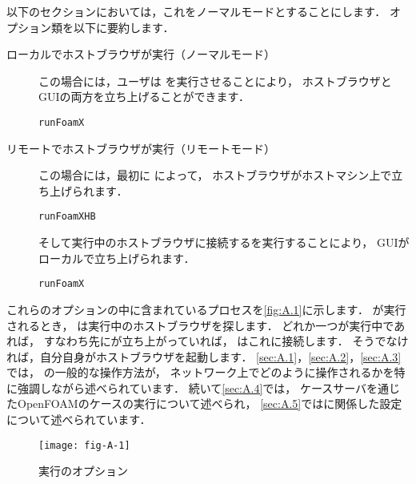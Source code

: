 以下のセクションにおいては，これをノーマルモードとすることにします．
オプション類を以下に要約します．
\begin{description}
 \item[ローカルでホストブラウザが実行（ノーマルモード）]
            この場合には，ユーザは
%
%
            を実行させることにより，
            ホストブラウザとGUIの両方を立ち上げることができます．
\begin{OFterminal}
\begin{verbatim}
runFoamX
\end{verbatim}
\end{OFterminal}
 \item[リモートでホストブラウザが実行（リモートモード）]
            この場合には，最初に
%
%
            によって，
            ホストブラウザがホストマシン上で立ち上げられます．
\begin{OFterminal}
\begin{verbatim}
runFoamXHB
\end{verbatim}
\end{OFterminal}
            そして実行中のホストブラウザに接続するを実行することにより，
            GUIがローカルで立ち上げられます．
\begin{OFterminal}
\begin{verbatim}
runFoamX
\end{verbatim}
\end{OFterminal}
\end{description}
これらのオプションの中に含まれているプロセスを\autoref{fig:A.1}に示します．
が実行されるとき，
は実行中のホストブラウザを探します．
どれか一つが実行中であれば，
すなわち先にが立ち上がっていれば，
はこれに接続します．
そうでなければ，自分自身がホストブラウザを起動します．
\autoref{sec:A.1}，\autoref{sec:A.2}，\autoref{sec:A.3}では，
の一般的な操作方法が，
ネットワーク上でどのように操作されるかを特に強調しながら述べられています．
続いて\autoref{sec:A.4}では，
ケースサーバを通じたOpenFOAMのケースの実行について述べられ，
\autoref{sec:A.5}ではに関係した設定について述べられています．


\begin{figure}[ht]
 \texttt{[image: fig-A-1]}
 \caption{実行のオプション}
 \label{fig:A.1}
\end{figure}



